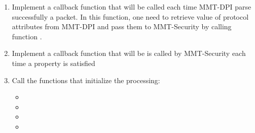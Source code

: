 \begin{enumerate}

\item Implement a callback function that will be called each time MMT-DPI parse successfully a packet. In this function, one need to retrieve value of protocol attributes from MMT-DPI and pass them to MMT-Security by calling function .

    
    
    
    

\item
Implement a callback function  that will be is called by MMT-Security each time a property is satisfied


\item
Call the functions that initialize the processing:

\begin{itemize}
    \item {}
    \item {}
    \item {}
    \item {}
\end{itemize}


\end{enumerate}
